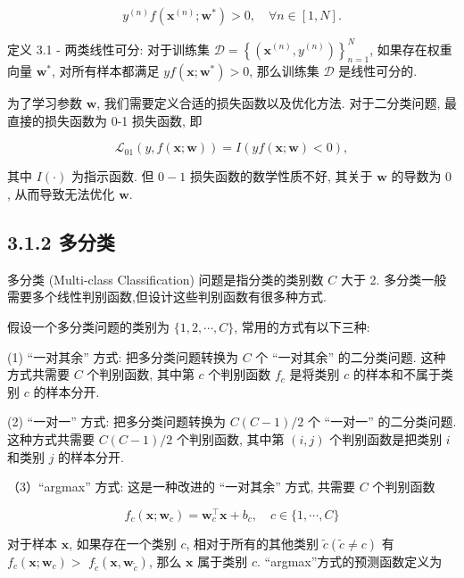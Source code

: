 \documentclass[10pt]{article}
\begin{document}
\begin{equation*}
y^{(n)} f\left(\boldsymbol{x}^{(n)} ; \boldsymbol{w}^{*}\right)>0, \quad \forall n \in[1, N] . \tag{3.8}
\end{equation*}


定义 3.1 - 两类线性可分: 对于训练集 $\mathcal{D}=\left\{\left(\boldsymbol{x}^{(n)}, y^{(n)}\right)\right\}_{n=1}^{N}$, 如果存在权重向量 $\boldsymbol{w}^{*}$, 对所有样本都满足 $y f\left(\boldsymbol{x} ; \boldsymbol{w}^{*}\right)>0$, 那么训练集 $\mathcal{D}$ 是线性可分的.

为了学习参数 $\boldsymbol{w}$, 我们需要定义合适的损失函数以及优化方法. 对于二分类问题, 最直接的损失函数为 0-1 损失函数, 即


\begin{equation*}
\mathcal{L}_{01}(y, f(\boldsymbol{x} ; \boldsymbol{w}))=I(y f(\boldsymbol{x} ; \boldsymbol{w})<0), \tag{3.9}
\end{equation*}


其中 $I(\cdot)$ 为指示函数. 但 $0-1$ 损失函数的数学性质不好, 其关于 $\boldsymbol{w}$ 的导数为 0 , 从而导致无法优化 $\boldsymbol{w}$.

\subsection*{3.1.2 多分类}
多分类 (Multi-class Classification) 问题是指分类的类别数 $C$ 大于 2. 多分类一般需要多个线性判别函数,但设计这些判别函数有很多种方式.

假设一个多分类问题的类别为 $\{1,2, \cdots, C\}$, 常用的方式有以下三种:

(1) “一对其余” 方式: 把多分类问题转换为 $C$ 个 “一对其余” 的二分类问题. 这种方式共需要 $C$ 个判别函数, 其中第 $c$ 个判别函数 $f_{c}$ 是将类别 $c$ 的样本和不属于类别 $c$ 的样本分开.

(2) “一对一” 方式: 把多分类问题转换为 $C(C-1) / 2$ 个 “一对一” 的二分类问题. 这种方式共需要 $C(C-1) / 2$ 个判别函数, 其中第 $(i, j)$ 个判别函数是把类别 $i$ 和类别 $j$ 的样本分开.

（3）“argmax” 方式: 这是一种改进的 “一对其余” 方式, 共需要 $C$ 个判别函数


\begin{equation*}
f_{c}\left(\boldsymbol{x} ; \boldsymbol{w}_{c}\right)=\boldsymbol{w}_{c}^{\top} \boldsymbol{x}+b_{c}, \quad c \in\{1, \cdots, C\} \tag{3.10}
\end{equation*}


对于样本 $\boldsymbol{x}$, 如果存在一个类别 $c$, 相对于所有的其他类别 $\tilde{c}(\tilde{c} \neq c)$ 有 $f_{c}\left(\boldsymbol{x} ; \boldsymbol{w}_{c}\right)>$ $f_{\tilde{c}}\left(\boldsymbol{x}, \boldsymbol{w}_{\tilde{c}}\right)$, 那么 $\boldsymbol{x}$ 属于类别 $c$. “argmax”方式的预测函数定义为
\end{document}

